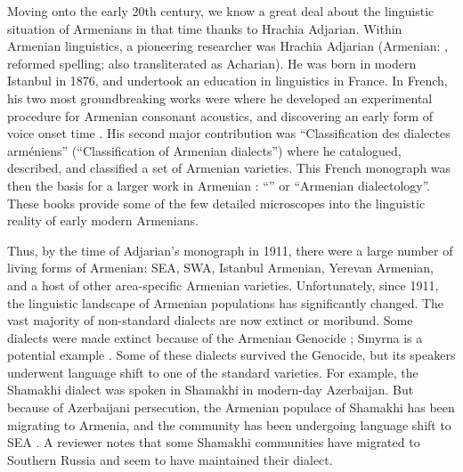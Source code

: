 Moving onto the early 20th century, we know a great deal about the linguistic situation of Armenians in that time  thanks to Hrachia Adjarian. Within Armenian linguistics, a pioneering researcher was Hrachia Adjarian (Armenian: , reformed spelling; also transliterated as Acharian). He was born in modern Istanbul in 1876, and undertook an education in linguistics in France. In French, his two most groundbreaking works were \citet{Adjarian-1899-ArmenianExplosives} where he developed an experimental procedure for Armenian consonant acoustics, and discovering an early form of voice onset time \citep{braun-2013-earlyCaseVOTAdjarian}. His second major contribution was \citet{Adjarian-1909-ClassificationArmenianDialect} ``Classification des dialectes arméniens'' (``Classification of Armenian dialects'') where he catalogued, described, and classified a set of Armenian varieties. This French monograph was then the basis for a larger work in Armenian \citep{Adjarian-1911-DialectologyBook}: ``'' or ``Armenian dialectology''. These books provide some of the few detailed microscopes into the linguistic reality of early modern Armenians. 

Thus, by the time of Adjarian's monograph in 1911, there were a large number of living forms of Armenian: SEA, SWA, Istanbul Armenian, Yerevan Armenian, and a host of other area-specific Armenian varieties. Unfortunately, since 1911, the linguistic landscape of Armenian populations has significantly changed. The vast majority of non-standard dialects are now extinct or moribund. Some dialects were made extinct because of the Armenian Genocide \citep{Katvalyan-2015-GenocideArmenianLanguage}; Smyrna is a potential example \citep{Vaux-2012-ArmenianSmyrna}. Some of these dialects survived the Genocide, but its speakers underwent language shift to one of the standard varieties. For example, the Shamakhi dialect was spoken in Shamakhi in modern-day Azerbaijan. But because of Azerbaijani persecution, the Armenian populace of Shamakhi has been migrating to Armenia, and the community has been undergoing language shift to SEA \citep{Vlasyan-2019-Shamakhi}. A reviewer notes that some Shamakhi communities have migrated to Southern Russia and seem to have maintained their dialect.   

